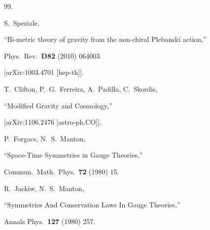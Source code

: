 \documentclass [prd,reprint,eqsecnum,nofootinbib]  {revtex4-1}
\begin{document}
\begin{thebibliography}{99.}

  S.~Speziale,

  ``Bi-metric theory of gravity from the non-chiral Plebanski action,''

  Phys.\ Rev.\  {\bf D82 } (2010)  064003.

  [arXiv:1003.4701 [hep-th]].





  T.~Clifton, P.~G.~Ferreira, A.~Padilla, C.~Skordis,

 ``Modified Gravity and Cosmology,''



  [arXiv:1106.2476 [astro-ph.CO]].











































  P.~Forgacs, N.~S.~Manton,

  ``Space-Time Symmetries in Gauge Theories,''

  Commun.\ Math.\ Phys.\  {\bf 72 } (1980)  15.





  R.~Jackiw, N.~S.~Manton,

  ``Symmetries And Conservation Laws In Gauge Theories,''

  Annals Phys.\  {\bf 127 } (1980)  257.



\end{thebibliography}
\end{document}
